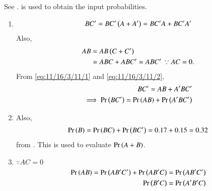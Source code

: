 See 
.
 is used to obtain the input probabilities.
\begin{enumerate}
	\item
\begin{align}
BC^\prime	
=
	BC^\prime\brak{A+A^\prime}=	
	BC^\prime A+BC^\prime A^\prime	
\label{eq:11/16/3/11/1}
\end{align}
Also, 
\begin{align}
	AB&=
	AB\brak{C+C^\prime}
	\\
	&=	
	ABC+ABC^\prime = ABC^\prime  \, \because AC=0.
\label{eq:11/16/3/11/2}
\end{align}
From 
\eqref{eq:11/16/3/11/1}
and
\eqref{eq:11/16/3/11/2},
\begin{align}
BC^\prime = AB+A^\prime BC^\prime
\\
\implies
	\Pr\left(BC^\prime\right) = \Pr\left(AB\right)+\Pr\left(A^\prime BC^\prime\right)
\end{align}
\item Also, 
\begin{align}
\Pr\left(B\right) = \Pr\left(BC\right)+\Pr\left(BC^\prime\right) = 0.17+0.15 = 0.32
\end{align}
from 
.  This is used to evaluate $\Pr\left(A+B\right)$.
\item $\because AC=0$
\begin{align}
	\Pr\left(AB\right)=\Pr\left(AB^\prime C^\prime\right) +\Pr\left(A B^\prime C\right) &= \Pr\left(AB^\prime C^\prime\right)
	\\
	\Pr\left(B^\prime C\right) &= \Pr\left(A^\prime B^\prime C\right)
\end{align}
\end{enumerate}
